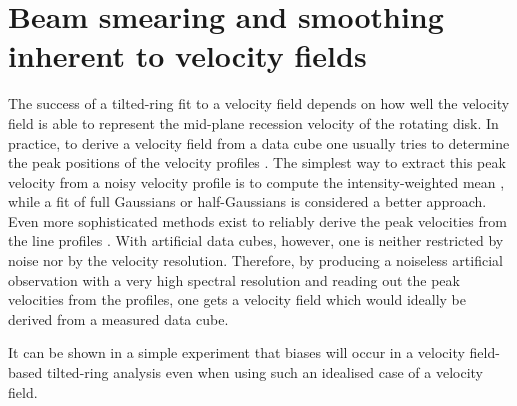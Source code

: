 \documentclass[oldversion]{aa}
\newcommand{\cngs}[1]{{#1}}
\begin{document}
\section{Beam smearing and smoothing inherent to velocity fields}
\label{Sect_2.3}
\cngs{
The success of a tilted-ring fit to a velocity field depends on how
well the velocity field is able to represent the mid-plane recession
velocity of the rotating disk. In practice, to derive a velocity field from a data cube one usually tries to
determine the peak positions of the velocity profiles \citep[e.g.][ Chap. 3]{Swaters99}.
The simplest way to extract this peak velocity from a noisy velocity profile is to compute the intensity-weighted mean
\citep[the first moment, e.g.][]{Rogstad71,Simon03,Simon05}, while a
fit of full Gaussians \citep[e.g.][]{Begemann87,Swaters99} or
half-Gaussians \citep[e.g.][]{Garcia-Ruiz02a} is considered a
better approach. Even more sophisticated methods exist to
reliably derive the peak velocities from the line profiles
\citep[][]{Gentile04}. With artificial data cubes, however, one is neither
restricted by noise nor by the velocity resolution. Therefore, by
producing a noiseless artificial observation with a very
high spectral resolution and reading out the peak velocities from the
profiles, one gets a velocity field which would ideally be derived from a measured data cube.}

\cngs{It can be shown in a simple experiment that biases will occur in a velocity field-based tilted-ring analysis even when using such an idealised case of a velocity field.}
\end{document}
